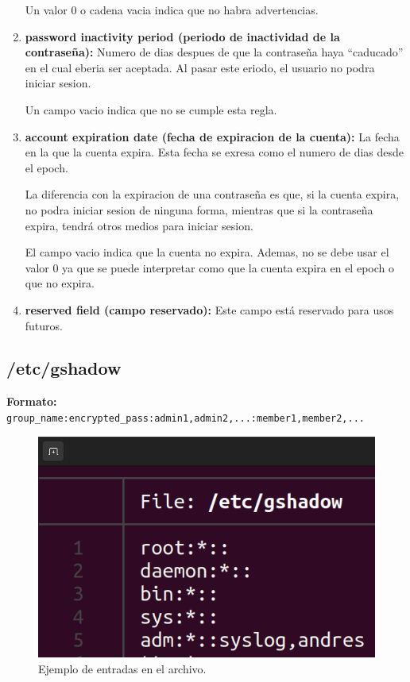 \documentclass{article}
\begin{document}
\begin{enumerate}
    Un valor 0 o cadena vacia indica que no habra advertencias.

    \item \textbf{password inactivity period (periodo de inactividad de la contraseña): }Numero de dias despues de que la contraseña haya ``caducado'' en el cual eberia ser aceptada. Al pasar este eriodo, el usuario no podra iniciar sesion.
    
    Un campo vacio indica que no se cumple esta regla.

    \item  \textbf{account expiration date (fecha de expiracion de la cuenta): }La fecha en la que la cuenta expira. Esta fecha se exresa como el numero de dias desde el epoch.
    
    La diferencia con la expiracion de una contraseña es que, si la cuenta expira, no podra iniciar sesion de ninguna forma, mientras que si la contraseña expira, tendrá otros medios para iniciar sesion.

    El campo vacio indica que la cuenta no expira. Ademas, no se debe usar el valor 0 ya que se puede interpretar como que la cuenta expira en el epoch o que no expira.

    \item \textbf{reserved field (campo reservado): }Este campo está reservado para usos futuros.
\end{enumerate}

\subsection{/etc/gshadow}
\textbf{Formato: }\verb|group_name:encrypted_pass:admin1,admin2,...:member1,member2,...|

\bigskip

\begin{figure}[H]
    \includegraphics[width=\textwidth]{imagenes/gshadowfile.png}
    \caption{Ejemplo de entradas en el archivo.}    
\end{figure}
\end{document}
